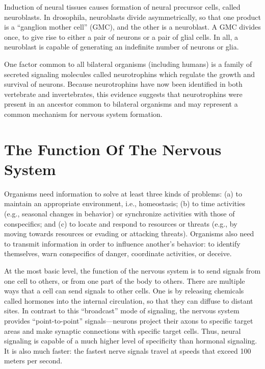 Induction of neural tissues causes formation of neural precursor cells, called neuroblasts. In drosophila, neuroblasts divide asymmetrically, so that one product is a ``ganglion mother cell'' (GMC), and the other is a neuroblast. A GMC divides once, to give rise to either a pair of neurons or a pair of glial cells. In all, a neuroblast is capable of generating an indefinite number of neurons or glia.

One factor common to all bilateral organisms (including humans) is a family of secreted signaling molecules called neurotrophins which regulate the growth and survival of neurons. Because neurotrophins have now been identified in both vertebrate and invertebrates, this evidence suggests that neurotrophins were present in an ancestor common to bilateral organisms and may represent a common mechanism for nervous system formation.

\hypertarget{the-function-of-the-nervous-system}{%
\section{The Function Of The Nervous System}\label{the-function-of-the-nervous-system}}

Organisms need information to solve at least three kinds of problems: (a) to maintain an appropriate environment, i.e., homeostasis; (b) to time activities (e.g., seasonal changes in behavior) or synchronize activities with those of conspecifics; and (c) to locate and respond to resources or threats (e.g., by moving towards resources or evading or attacking threats). Organisms also need to transmit information in order to influence another's behavior: to identify themselves, warn conspecifics of danger, coordinate activities, or deceive.

At the most basic level, the function of the nervous system is to send signals from one cell to others, or from one part of the body to others. There are multiple ways that a cell can send signals to other cells. One is by releasing chemicals called hormones into the internal circulation, so that they can diffuse to distant sites. In contrast to this ``broadcast'' mode of signaling, the nervous system provides ``point-to-point'' signals---neurons project their axons to specific target areas and make synaptic connections with specific target cells. Thus, neural signaling is capable of a much higher level of specificity than hormonal signaling. It is also much faster: the fastest nerve signals travel at speeds that exceed 100 meters per second.

